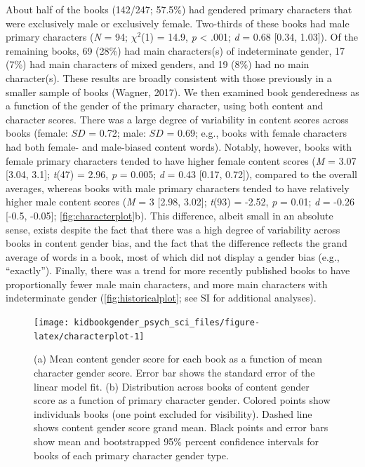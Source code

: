 \documentclass[
  english,
  ,man,floatsintext]{apa6}
\begin{document}
About half of the books (142/247; 57.5\%) had gendered primary characters that were exclusively male or exclusively female. Two-thirds of these books had male primary characters (\emph{N} = 94; \(\chi^2\)(1) = 14.9, \emph{p} \textless{} .001; \emph{d} = 0.68 {[}0.34, 1.03{]}). Of the remaining books, 69 (28\%) had main characters(s) of indeterminate gender, 17 (7\%) had main characters of mixed genders, and 19 (8\%) had no main character(s). These results are broadly consistent with those previously in a smaller sample of books (Wagner, 2017). We then examined book genderedness as a function of the gender of the primary character, using both content and character scores. There was a large degree of variability in content scores across books (female: \(SD\) = 0.72; male: \(SD\) = 0.69; e.g., books with female characters had both female- and male-biased content words). Notably, however, books with female primary characters tended to have higher female content scores (\emph{M} = 3.07 {[}3.04, 3.1{]}; \emph{t}(47) = 2.96, \emph{p} = 0.005; \emph{d} = 0.43 {[}0.17, 0.72{]}), compared to the overall averages, whereas books with male primary characters tended to have relatively higher male content scores (\emph{M} = 3 {[}2.98, 3.02{]}; \emph{t}(93) = -2.52, \emph{p} = 0.01; \emph{d} = -0.26 {[}-0.5, -0.05{]}; \autoref{fig:characterplot}b). This difference, albeit small in an absolute sense, exists despite the fact that there was a high degree of variability across books in content gender bias, and the fact that the difference reflects the grand average of words in a book, most of which did not display a gender bias (e.g., ``exactly''). Finally, there was a trend for more recently published books to have proportionally fewer male main characters, and more main characters with indeterminate gender (\autoref{fig:historicalplot}; see SI for additional analyses).

\begin{figure}[t!]
\texttt{[image: kidbookgender\_psych\_sci\_files/figure-latex/characterplot-1]} \caption{(a) Mean content gender score for each book as a function of mean character gender score. Error bar shows the standard error of the linear model fit.  (b) Distribution across books of content gender score as a function of primary character gender. Colored points show individuals books (one point excluded for visibility). Dashed line shows content gender score grand mean. Black points and error bars show mean and bootstrapped 95\% percent confidence intervals for books of each primary character gender type.}\label{fig:characterplot}
\end{figure}
\end{document}
